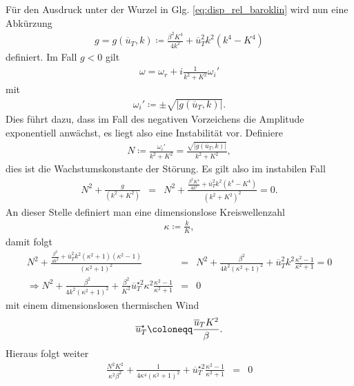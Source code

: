 \documentclass{book}
\newcommand\newoverline[1]{%
\overline{#1}}
\begin{document}
Für den Ausdruck unter der Wurzel in Glg. \eqref{eq:disp_rel_baroklin} wird nun eine Abkürzung
%
\begin{eqnarray}
g = g\left(\newoverline{u}_T, k\right) \coloneqq\frac{\beta^2K^4}{4k^2} + \newoverline{u}_T^2k^2\left(k^4 - K^4\right)
\end{eqnarray}
%
definiert. Im Fall $g<0$ gilt
%
\begin{eqnarray}
\omega = \omega_r + i\frac{1}{k^2 + K^2}\omega_i'
\end{eqnarray}
%
mit
%
\begin{eqnarray}
\omega_i' \coloneqq\pm\sqrt{\left|g\left(\newoverline{u}_T, k\right)\right|}.
\end{eqnarray}
%
Dies führt dazu, dass im Fall des negativen Vorzeichens die Amplitude exponentiell anwächst, es liegt also eine Instabilität vor. Definiere
%
\begin{eqnarray}
N \coloneqq\frac{\omega_i'}{k^2 + K^2} = \frac{\sqrt{\left|g\left(\newoverline{u}_T, k\right)\right|}}{k^2 + K^2}, 
\end{eqnarray}
%
dies ist die Wachstumskonstante der Störung. Es gilt also im instabilen Fall
%
\begin{eqnarray}
N^2 + \frac{g}{\left(k^2 + K^2\right)} & = & N^2 + \frac{\frac{\beta^2K^4}{4k^2} + \newoverline{u}_T^2k^2\left(k^4 - K^4\right)}{\left(k^2 + K^2\right)^2} = 0.
\end{eqnarray}
%
An dieser Stelle definiert man eine dimensionslose Kreiswellenzahl
%
\begin{eqnarray}
\kappa \coloneqq\frac{k}{K}, 
\end{eqnarray}
%
damit folgt
%
\begin{eqnarray}
N^2 + \frac{\frac{\beta^2}{4k^2} + \newoverline{u}_T^2k^2\left(\kappa^2 + 1\right)\left(\kappa^2 - 1\right)}{\left(\kappa^2 + 1\right)^2} & = & N^2 + \frac{\beta^2}{4k^2\left(\kappa^2 + 1\right)^2} + \newoverline{u}_T^2k^2\frac{\kappa^2 - 1}{\kappa^2 + 1} = 0\nonumber\\
\Rightarrow N^2 + \frac{\beta^2}{4k^2\left(\kappa^2 + 1\right)^2} + \frac{\beta^2}{K^2}\newoverline{u}^{\star2}_T\kappa^2\frac{\kappa^2 - 1}{\kappa^2 + 1} & = & 0
\end{eqnarray}
%
mit einem dimensionslosen thermischen Wind
%
\begin{eqnarray}
\newoverline{u}_T^\star \coloneqq\frac{\newoverline{u}_TK^2}{\beta}.
\end{eqnarray}
%
Hieraus folgt weiter
%
\begin{eqnarray}
\frac{N^2K^2}{\kappa^2\beta^2} + \frac{1}{4\kappa^4\left(\kappa^2 + 1\right)^2} + \newoverline{u}^{\star2}_T\frac{\kappa^2 - 1}{\kappa^2 + 1} & = & 0
\end{eqnarray}
\end{document}
